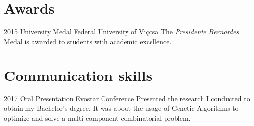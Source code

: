\documentclass[a4paper]{cv-friggeri-x}
\begin{document}
\section{Awards}

\begin{entrylist}


\entry
    {2015}
    {University Medal}
    {Federal University of Vi\c cosa}
    {The \textit{Presidente Bernardes} Medal is awarded to students with academic excellence.}


\end{entrylist}


\section{Communication skills}

\begin{entrylist}


\entry
{2017}
{Oral Presentation}
{Evostar Conference}
{Presented the research I conducted to obtain my Bachelor's degree. It was about the usage of Genetic Algorithms to optimize and solve a multi-component combinatorial problem.}


\end{entrylist}



\end{document}
